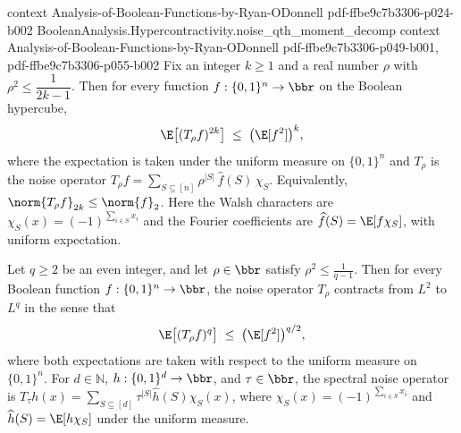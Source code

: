 \begin{theorem}
  {context}
  {Analysis-of-Boolean-Functions-by-Ryan-ODonnell}
  {pdf-ffbe9c7b3306-p024-b002}
\proofstep
  {BooleanAnalysis.Hypercontractivity.noise_qth_moment_decomp}
  {context}
  {Analysis-of-Boolean-Functions-by-Ryan-ODonnell}
  {pdf-ffbe9c7b3306-p049-b001,
    pdf-ffbe9c7b3306-p055-b002}
\label{BooleanAnalysis.Hypercontractivity.hypercontractivity_2_2k}
Fix an integer $k \ge 1$ and a real number $\rho$ with $\rho^2 \le \dfrac{1}{2k-1}$.
Then for every function $f : \{0,1\}^n \to \bbr$ on the Boolean hypercube,
\[
  \E\bigl[(T_\rho f)^{2k}\bigr] \;\le\; \bigl(\E[f^2]\bigr)^{k},
\]
where the expectation is taken under the uniform measure on $\{0,1\}^n$ and $T_\rho$ is
the noise operator $T_\rho f = \sum_{S \subseteq [n]} \rho^{|S|}\,\hat f(S)\,\chi_S$.
Equivalently, $\norm{T_\rho f}_{2k} \le \norm{f}_2$. Here the Walsh characters are
$\chi_S(x)=(-1)^{\sum_{i\in S}x_i}$ and the Fourier coefficients are $\widehat
f(S)=\E[f\chi_S]$, with uniform expectation.
\end{theorem}

\begin{theorem}
\leanok
{}
\label{BooleanAnalysis.Hypercontractivity.hypercontractivity_2_q}
Let $q \ge 2$ be an even integer, and let $\rho \in \bbr$ satisfy $\rho^2 \le
\tfrac{1}{q-1}$. Then for every Boolean function $f : \{0,1\}^n \to \bbr$, the noise
operator $T_\rho$ contracts from $L^2$ to $L^q$ in the sense that
\[
  \E\bigl[(T_\rho f)^q\bigr] \;\le\; \bigl(\E[f^2]\bigr)^{q/2},
\]
where both expectations are taken with respect to the uniform measure on $\{0,1\}^n$.
For $d\in\mathbb N$, $h:\{0,1\}^d\to\bbr$, and $\tau\in\bbr$, the spectral noise
operator is $T_\tau h(x)=\sum_{S\subseteq[d]}\tau^{|S|}\widehat h(S)\chi_S(x)$, where
$\chi_S(x)=(-1)^{\sum_{i\in S}x_i}$ and $\widehat h(S)=\E[h\chi_S]$ under the uniform
measure.
\end{theorem}

